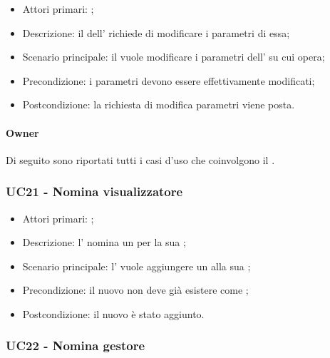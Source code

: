 \documentclass[../analisi-dei-requisiti]{subfiles}
\begin{document}
\begin{itemize}
\item Attori primari: ;
\item Descrizione: il  dell' richiede di modificare i parametri di essa;
\item Scenario principale: il  vuole modificare i parametri dell' su cui opera;
\item Precondizione: i parametri devono essere effettivamente modificati;
\item Postcondizione: la richiesta di modifica parametri viene posta.

\end{itemize}

\paragraph{Owner}
Di seguito sono riportati tutti i casi d'uso che coinvolgono il  .

\subsubsection{UC21 - Nomina visualizzatore}
\label{subsub:UC21}

\begin{itemize}
\item Attori primari: ;
\item Descrizione: l'  nomina un  per la sua ;
\item Scenario principale: l'  vuole aggiungere un  alla sua ;
\item Precondizione: il nuovo  non deve già esistere come ;
\item Postcondizione: il nuovo  è stato aggiunto.

\end{itemize}


\subsubsection{UC22 - Nomina gestore}
\label{subsub:UC22}
\end{document}
